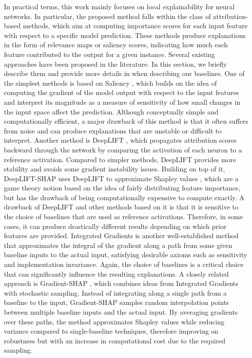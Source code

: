 In practical terms, this work mainly focuses on \posthoc local explainability for neural networks. In particular, the proposed method falls within the class of attribution-based methods, which aim at computing importance scores for each input feature with respect to a specific model prediction. These methods produce explanations in the form of relevance maps or saliency scores, indicating how much each feature contributed to the output for a given instance. 
Several existing approaches have been proposed in the literature. In this section, we briefly describe them and provide more details in  when describing our baselines. One of the simplest methods is based on Saliency \cite{saliency}, which builds on the idea of computing the gradient of the model output with respect to the input features and interpret its magnitude as a measure of sensitivity of how small changes in the input space affect the prediction. Although conceptually simple and computationally efficient, a major drawback of this method is that it often suffers from noise and can produce explanations that are unstable or difficult to interpret.
Another method is DeepLIFT \cite{deeplift}, which propagates attribution scores backward through the network by comparing the activation of each neuron to a reference activation. Compared to simpler methods, DeepLIFT provides more stability and avoids some gradient instability issues. Building on top of it, DeepLIFT-SHAP \cite{deepliftshap} uses DeepLIFT to approximate Shapley values \cite{shapley_values}, which are a game theory notion based on the idea of fairly distributing feature importance, but has the drawback of being computationally expensive to compute exactly. A drawback of DeepLIFT and other methods based on it is that it is sensitive to the choice of baselines that are used as reference activations. Therefore, in some cases, it can produce drastically different results depending on which prior features are provided.
Integrated Gradients \cite{lig} is another well-established method that approximates the integral of the gradient along a path from some given baseline inputs to the actual input, satisfying desirable axioms such as sensitivity and implementation invariance. Again, the choice of baselines is a critical choice that can significantly influence the resulting explanations.
A closely related approach is Gradient-SHAP \cite{gradient_shap}, which combines ideas from Integrated Gradients with stochastic sampling. Instead of integrating along a single path from a baseline to the input, Gradient-SHAP samples random interpolation points between multiple baseline inputs and the actual input. By averaging gradients over these paths, the method approximates Shapley values while reducing variance compared to single-baseline techniques, therefore improving on robustness but with an increase in computational cost due to the required sampling.
